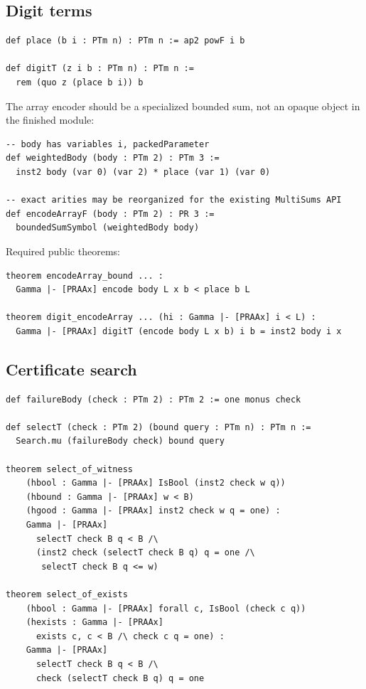 \subsection{Digit terms}

\begin{lstlisting}[language=Lean]
def place (b i : PTm n) : PTm n := ap2 powF i b

def digitT (z i b : PTm n) : PTm n :=
  rem (quo z (place b i)) b
\end{lstlisting}

The array encoder should be a specialized bounded sum, not an opaque object in
the finished module:

\begin{lstlisting}[language=Lean]
-- body has variables i, packedParameter
def weightedBody (body : PTm 2) : PTm 3 :=
  inst2 body (var 0) (var 2) * place (var 1) (var 0)

-- exact arities may be reorganized for the existing MultiSums API
def encodeArrayF (body : PTm 2) : PR 3 :=
  boundedSumSymbol (weightedBody body)
\end{lstlisting}

Required public theorems:

\begin{lstlisting}[language=Lean]
theorem encodeArray_bound ... :
  Gamma |- [PRAAx] encode body L x b < place b L

theorem digit_encodeArray ... (hi : Gamma |- [PRAAx] i < L) :
  Gamma |- [PRAAx] digitT (encode body L x b) i b = inst2 body i x
\end{lstlisting}

\subsection{Certificate search}

\begin{lstlisting}[language=Lean]
def failureBody (check : PTm 2) : PTm 2 := one monus check

def selectT (check : PTm 2) (bound query : PTm n) : PTm n :=
  Search.mu (failureBody check) bound query

theorem select_of_witness
    (hbool : Gamma |- [PRAAx] IsBool (inst2 check w q))
    (hbound : Gamma |- [PRAAx] w < B)
    (hgood : Gamma |- [PRAAx] inst2 check w q = one) :
    Gamma |- [PRAAx]
      selectT check B q < B /\
      (inst2 check (selectT check B q) q = one /\
       selectT check B q <= w)

theorem select_of_exists
    (hbool : Gamma |- [PRAAx] forall c, IsBool (check c q))
    (hexists : Gamma |- [PRAAx]
      exists c, c < B /\ check c q = one) :
    Gamma |- [PRAAx]
      selectT check B q < B /\
      check (selectT check B q) q = one
\end{lstlisting}

